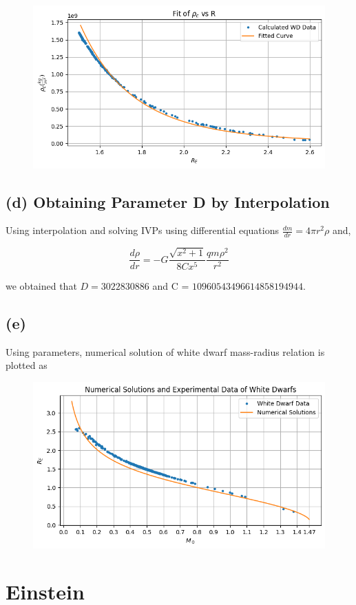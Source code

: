 \documentclass[aps,twocolumn,showpacs,preprintnumbers,nofootinbib,prl,superscriptaddress,groupedaddress]{revtex4-2}
\begin{document}
\begin{figure}[!htb]
	\centering
	\includegraphics[width=0.5\linewidth]{Plots/newton-part-c4}
	\caption{}
	\label{fig:newton-part-c4}
\end{figure}


\subsection{(d) Obtaining Parameter D by Interpolation}

Using interpolation and solving IVPs using differential equations $\frac{dm}{dr} = 4\pi r^2 \rho$ and,

\begin{equation}
	\frac{d\rho}{dr} = -G \frac{\sqrt{x^2+1}}{8Cx^5}\frac{qm\rho^2}{r^2}
\end{equation}

we obtained that $D = 3022830886$ and C = $10960543496614858194944$.

\subsection{(e)}

Using parameters, numerical solution of white dwarf mass-radius relation is plotted as

\begin{figure}[!htb]
	\centering
	\includegraphics[width=0.5\linewidth]{Plots/newton-part-e}
	\caption{}
	\label{fig:newton-part-e}
\end{figure}


\section{Einstein}
\end{document}
